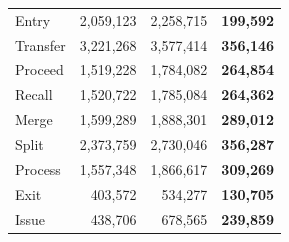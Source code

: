 \begin{minipage}{\linewidth}
\begin{minipage}[t]{.49\linewidth}
{\begin{tabular}{@{}lrrr@{}}
                \midrule
                Entry          & 2,059,123        & 2,258,715        & \textbf{199,592} \\
                Transfer       & 3,221,268        & 3,577,414        & \textbf{356,146} \\
                Proceed        & 1,519,228        & 1,784,082        & \textbf{264,854} \\
                Recall         & 1,520,722        & 1,785,084        & \textbf{264,362} \\
                Merge          & 1,599,289        & 1,888,301        & \textbf{289,012} \\
                Split          & 2,373,759        & 2,730,046        & \textbf{356,287} \\
                Process        & 1,557,348        & 1,866,617        & \textbf{309,269} \\
                Exit           & 403,572          & 534,277          & \textbf{130,705} \\
                Issue          & 438,706          & 678,565          & \textbf{239,859} \\
                \bottomrule\end{tabular}}
    \end{minipage}
    \par\medskip
\end{minipage}\par\medskip
